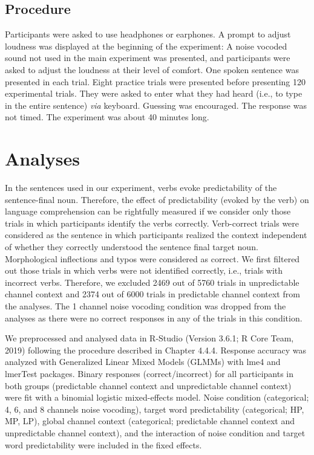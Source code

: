 \documentclass[a4paper, nobind]{templates/ociamthesis}
\begin{document}
\hypertarget{procedure-2}{%
\subsection{Procedure}\label{procedure-2}}

Participants were asked to use headphones or earphones.
A prompt to adjust loudness was displayed at the beginning of the experiment: A noise vocoded sound not used in the main experiment was presented, and participants were asked to adjust the loudness at their level of comfort.
One spoken sentence was presented in each trial.
Eight practice trials were presented before presenting 120 experimental trials.
They were asked to enter what they had heard (i.e., to type in the entire sentence) \emph{via} keyboard.
Guessing was encouraged.
The response was not timed.
The experiment was about 40 minutes long.

\hypertarget{analyses-2}{%
\section{Analyses}\label{analyses-2}}

In the sentences used in our experiment, verbs evoke predictability of the sentence-final noun.
Therefore, the effect of predictability (evoked by the verb) on language comprehension can be rightfully measured if we consider only those trials in which participants identify the verbs correctly.
Verb-correct trials were considered as the sentence in which participants realized the context independent of whether they correctly understood the sentence final target noun.
Morphological inflections and typos were considered as correct.
We first filtered out those trials in which verbs were not identified correctly, i.e., trials with incorrect verbs.
Therefore, we excluded 2469 out of 5760 trials in unpredictable channel context and 2374 out of 6000 trials in predictable channel context from the analyses.
The 1 channel noise vocoding condition was dropped from the analyses as there were no correct responses in any of the trials in this condition.

We preprocessed and analysed data in R-Studio (Version 3.6.1; R Core Team, 2019) following the procedure described in Chapter 4.4.4.
Response accuracy was analyzed with Generalized Linear Mixed Models (GLMMs) with lme4 \autocite{Bates2015} and lmerTest \autocite{Kuznetsova2017} packages.
Binary responses (correct/incorrect) for all participants in both groups (predictable channel context and unpredictable channel context) were fit with a binomial logistic mixed-effects model\autocite{Jaeger2006,Jaeger2008}.
Noise condition (categorical; 4, 6, and 8 channels noise vocoding), target word predictability (categorical; HP, MP, LP), global channel context (categorical; predictable channel context and unpredictable channel context), and the interaction of noise condition and target word predictability were included in the fixed effects.
\end{document}
